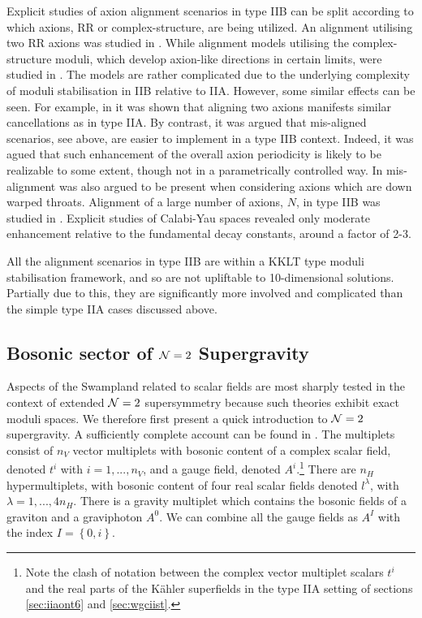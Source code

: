 \documentclass[11pt,a4paper]{article}
\numberwithin{equation}{section}
\numberwithin{table}{section}\setlength{\multlinegap}{25pt}
\begin{document}
Explicit studies of axion alignment scenarios in type IIB can be split according to which axions, RR or complex-structure, are being utilized. An alignment utilising  two RR axions was studied in \cite{Ben-Dayan:2014lca,Rudelius:2015xta}. While alignment models utilising the complex-structure moduli, which develop axion-like directions in certain limits, were studied in \cite{Hebecker:2015rya,Blumenhagen:2016bfp}. The models are rather complicated due to the underlying complexity of moduli stabilisation in IIB relative to IIA. However, some similar effects can be seen. For example, in \cite{Hebecker:2018fln} it was shown that aligning two axions manifests similar cancellations as in type IIA. By contrast, it was argued that mis-aligned scenarios, see above, are easier to implement in a type IIB context. Indeed, it was agued that such enhancement of the overall axion periodicity is likely to be realizable to some extent, though not in a parametrically controlled way. In \cite{Hebecker:2018yxs} mis-alignment was also argued to be present when considering axions which are down warped throats. Alignment of a large number of axions, $N$, in type IIB was studied in \cite{Bachlechner:2014gfa,Junghans:2015hba,Long:2016jvd}. Explicit studies of Calabi-Yau spaces revealed only moderate enhancement relative to the fundamental decay constants, around a factor of 2-3.  

All the alignment scenarios in type IIB are within a KKLT type moduli stabilisation framework, and so are not upliftable to 10-dimensional solutions. Partially due to this, they are significantly more involved and complicated than the simple type IIA cases discussed above.

\subsection{Bosonic sector of ${\cal N}=2$ Supergravity}
\label{sec:n2sugra}

Aspects of the Swampland related to scalar fields are most sharply tested in the context of extended ${\cal N}=2$ supersymmetry because such theories exhibit exact moduli spaces. We therefore first present a quick introduction to ${\cal N}=2$ supergravity. A sufficiently complete account can be found in \cite{Ceresole:1995ca,Andrianopoli:1996cm}. The multiplets consist of $n_V$ vector multiplets with bosonic content of a complex scalar field, denoted $t^i$ with $i=1,...,n_V$, and a gauge field, denoted $A^i$.\footnote{Note the clash of notation between the complex vector multiplet scalars $t^i$ and the real parts of the K{\"a}hler superfields in the type IIA setting of sections \ref{sec:iiaont6} and \ref{sec:wgciist}.} There are $n_H$ hypermultiplets, with bosonic content of four real scalar fields denoted $l^{\lambda}$, with $\lambda=1,...,4n_H$. There is a gravity multiplet which contains the bosonic fields of a graviton and a graviphoton $A^0$. We can combine all the gauge fields as $A^I$ with the index $I=\left\{0,i\right\}$.
\end{document}
